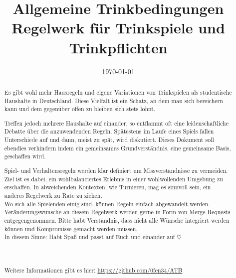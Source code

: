 \documentclass{report}
\title{\Huge Allgemeine Trinkbedingungen \\[2ex] \Large Regelwerk für Trinkspiele und Trinkpflichten}
\author{}
\date{\today}
\begin{document}


\maketitle
\begin{abstract}

	Es gibt wohl mehr Hausregeln und eigene Variationen von Trinkspielen als studentische Haushalte in Deutschland.
	Diese Vielfalt ist ein Schatz, an dem man sich bereichern kann und dem gegenüber offen zu bleiben sich stets lohnt.
	
	Treffen jedoch mehrere Haushalte auf einander, so entflammt oft eine leidenschaftliche Debatte über die anzuwendenden Regeln.
	Spätestens im Laufe eines Spiels fallen Unterschiede auf und dann, meist zu spät, wird diskutiert.
	Dieses Dokument soll ebendies verhindern indem ein gemeinsames Grundverständnis, eine gemeinsame Basis, geschaffen wird.

	Spiel- und Verhaltensregeln werden klar definiert um Missverständnisse zu vermeiden.
	Ziel ist es dabei, ein wohlbalanciertes Erlebnis in einer wohlwollenden Umgebung zu erschaffen.
	In abweichenden Kontexten, wie Turnieren, mag es sinnvoll sein, ein anderes Regelwerk zu Rate zu ziehen.
	\\

	Wo sich alle Spielenden einig sind, können Regeln einfach abgewandelt werden.
	Veränderungswünsche an diesem Regelwerk werden gerne in Form von Merge Requests entgegengenommen.
	Bitte habt Verständnis, dass nicht alle Wünsche integriert werden können und Kompromisse gemacht werden müssen.
	\\

	In diesem Sinne: Habt Spaß und passt auf Euch und einander auf \begin{math}
		\heartsuit
	\end{math}
	\\
	\\
	\\
	\\
	Weitere Informationen gibt es hier:
	\url{https://github.com/0fen34/ATB}
\end{abstract}
\tableofcontents
\cleardoublepage{}











\end{document}
